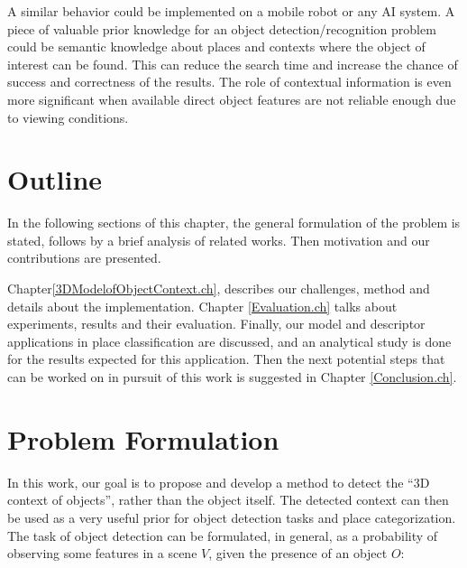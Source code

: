 A similar behavior could be implemented on a mobile robot or any AI system. A piece of valuable prior knowledge for an object detection/recognition
problem could be semantic knowledge about places and contexts where the object of interest can be found. This can reduce the search time and increase the chance of success and correctness of the results. The role of
contextual information is even more significant when available direct object features are not reliable enough due to viewing conditions. 


\section {Outline}
\label{Outline.sec}

In the following sections of this chapter, the general formulation of the problem is stated, follows by a brief analysis of related works. Then motivation and our contributions are presented.


Chapter\ref{3DModelofObjectContext.ch}, describes our challenges, method and details about the implementation. Chapter \ref{Evaluation.ch} talks about   experiments, results and their evaluation. 
Finally, our model and descriptor applications in place classification are discussed, and an analytical study is done for the results expected for this application. Then the next potential steps that can be worked on in pursuit of this work is suggested in Chapter \ref{Conclusion.ch}.

\section{Problem Formulation}
\label{Formulation.sec}

In this work, our goal is to propose and develop a method to detect the ``3D context of objects'', rather than the object itself. The detected context can then be used as a very useful prior for object detection tasks and place categorization. The task of object detection can be formulated, in general, as a probability of observing some features in a scene $V$, given the presence of an object $O$:


